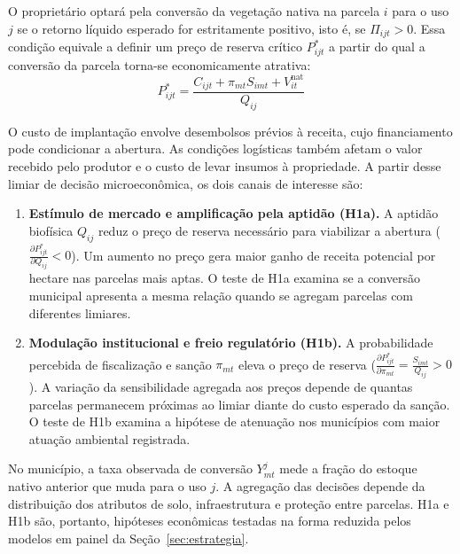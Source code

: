 O proprietário optará pela conversão da vegetação nativa na parcela $i$ para o uso $j$ se o retorno líquido esperado for estritamente positivo, isto é, se $\Pi_{ijt} > 0$. Essa condição equivale a definir um preço de reserva crítico $P_{ijt}^*$ a partir do qual a conversão da parcela torna-se economicamente atrativa:
\begin{equation}
    P_{ijt}^* = \frac{C_{ijt} + \pi_{mt} S_{imt} + V_{it}^{\mathrm{nat}}}{Q_{ij}}
    \label{eq:teorico-limiar}
\end{equation}

O custo de implantação envolve desembolsos prévios à receita, cujo financiamento pode condicionar a abertura. As condições logísticas também afetam o valor recebido pelo produtor e o custo de levar insumos à propriedade. A partir desse limiar de decisão microeconômica, os dois canais de interesse são:

\begin{enumerate}[label=(\roman*),leftmargin=1.8cm,itemsep=3pt,topsep=3pt]
    \item \textbf{Estímulo de mercado e amplificação pela aptidão (H1a).} A aptidão biofísica $Q_{ij}$ reduz o preço de reserva necessário para viabilizar a abertura ($\frac{\partial P_{ijt}^*}{\partial Q_{ij}} < 0$). Um aumento no preço gera maior ganho de receita potencial por hectare nas parcelas mais aptas. O teste de H1a examina se a conversão municipal apresenta a mesma relação quando se agregam parcelas com diferentes limiares.

    \item \textbf{Modulação institucional e freio regulatório (H1b).} A probabilidade percebida de fiscalização e sanção $\pi_{mt}$ eleva o preço de reserva ($\frac{\partial P_{ijt}^*}{\partial \pi_{mt}} = \frac{S_{imt}}{Q_{ij}} > 0$). A variação da sensibilidade agregada aos preços depende de quantas parcelas permanecem próximas ao limiar diante do custo esperado da sanção. O teste de H1b examina a hipótese de atenuação nos municípios com maior atuação ambiental registrada.
\end{enumerate}

No município, a taxa observada de conversão $Y_{mt}^j$ mede a fração do estoque nativo anterior que muda para o uso $j$. A agregação das decisões depende da distribuição dos atributos de solo, infraestrutura e proteção entre parcelas. H1a e H1b são, portanto, hipóteses econômicas testadas na forma reduzida pelos modelos em painel da Seção~\ref{sec:estrategia}.
